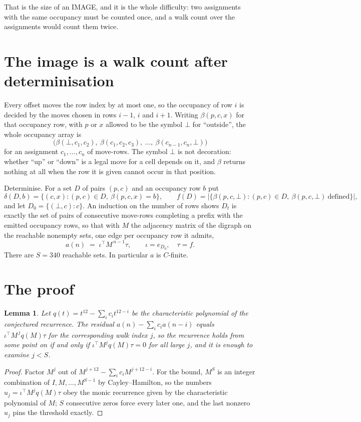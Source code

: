 \documentclass[11pt,a4paper]{article}
\theoremstyle{plain}
\newtheorem{lemma}[theorem]{Lemma}
\theoremstyle{definition}
\begin{document}
That is the size of an IMAGE, and it is the whole difficulty: two assignments with the same
occupancy must be counted once, and a walk count over the assignments would count them twice.

\section{The image is a walk count after determinisation}

Every offset moves the row index by at most one, so the occupancy of row $i$ is decided by the
moves chosen in rows $i-1$, $i$ and $i+1$. Writing $\beta(p,c,x)$ for that occupancy row, with
$p$ or $x$ allowed to be the symbol $\bot$ for ``outside'', the whole occupancy array is
\[
\bigl(\beta(\bot,c_1,c_2),\ \beta(c_1,c_2,c_3),\ \dots,\ \beta(c_{n-1},c_n,\bot)\bigr)
\]
for an assignment $c_1,\dots,c_n$ of move-rows. The symbol $\bot$ is not decoration: whether
``up'' or ``down'' is a legal move for a cell depends on it, and $\beta$ returns nothing at all
when the row it is given cannot occur in that position.

Determinise. For a set $D$ of pairs $(p,c)$ and an occupancy row $b$ put
\[
\delta(D,b)=\{(c,x):(p,c)\in D,\ \beta(p,c,x)=b\},\qquad
f(D)=\bigl|\{\beta(p,c,\bot):(p,c)\in D,\ \beta(p,c,\bot)\ \text{defined}\}\bigr| ,
\]
and let $D_0=\{(\bot,c):c\}$. An induction on the number of rows shows $D_t$ is exactly the
set of pairs of consecutive move-rows completing a prefix with the emitted occupancy rows, so
that with $M$ the adjacency matrix of the digraph on the reachable nonempty sets, one edge per
occupancy row it admits,
\[
a(n)\;=\;\iota^{\!\top}M^{\,n-1}\tau,\qquad \iota=e_{D_0},\quad \tau=f .
\]
There are $S=340$ reachable sets. In particular $a$ is $C$-finite.

\section{The proof}

\begin{lemma}\label{lem:crit}
Let $q(t)=t^{12}-\sum_i c_it^{12-i}$ be the characteristic polynomial of the
conjectured recurrence. The residual $a(n)-\sum_ic_ia(n-i)$ equals
$\iota^{\!\top}M^{\,j}q(M)\tau$ for the corresponding walk index $j$, so the recurrence
holds from some point on if and only if $\iota^{\!\top}M^{j}q(M)\tau=0$ for all large $j$,
and it is enough to examine $j<S$.
\end{lemma}

\begin{proof}
Factor $M^{j}$ out of $M^{j+12}-\sum_ic_iM^{j+12-i}$. For the bound, $M^{S}$
is an integer combination of $I,M,\dots,M^{S-1}$ by Cayley--Hamilton, so the numbers
$u_j=\iota^{\!\top}M^{j}q(M)\tau$ obey the monic recurrence given by the characteristic
polynomial of $M$; $S$ consecutive zeros force every later one, and the last nonzero $u_j$
pins the threshold exactly.
\end{proof}
\end{document}
